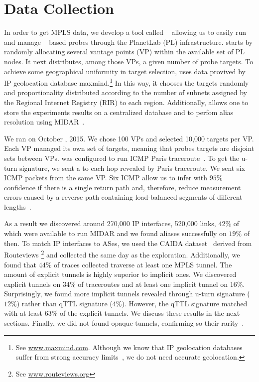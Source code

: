 \section{Data Collection}\label{dataset}
In order to get MPLS data, we develop a tool called
\magallanes~\cite{magallanes}  allowing
us to easily run and manage \scamper~\cite{Luckie10} based probes through the
PlanetLab (PL) infrastructure.  \magallanes starts by randomly allocating
several vantage points (VP) within the available set of PL nodes.  It next
distributes, among those VPs, a given number of probe targets.
To achieve some geographical uniformity in target selection, \magallanes uses
data provived by IP geolocation database maxmind.\footnote{See
\url{www.maxmind.com}.  Although we know that IP geolocation databases suffer
from strong accuracy limits~\cite{geolocation}, we do not need accurate geolocation.}  In this way, it chooses the
targets randomly and proportionality distributed according to the number of
subnets assigned by the Regional Internet Registry (RIR) to each region.
Additionally, \magallanes allows one to store the experiments results on a
centralized database and to perfom alias resolution using MIDAR~\cite{Keys13}.

We ran \magallanes on October , 2015.  We chose 100 VPs and selected
10,000 targets per VP.  Each VP managed its own set of targets, meaning that
probes targets are disjoint sets between VPs.  \scamper was configured to run
ICMP Paris traceroute~\cite{BRICE06}.  To get the u-turn signature,
we sent a \ping to each hop revealed by Paris traceroute. We sent six
ICMP \echorequest packets from the same VP.  Six ICMP \echoreply allow us to
infer with $95\%$ confidence if there is a single return path and, 
therefore, reduce measurement errors caused by a reverse path containing
load-balanced segments of different lengths~\cite{BRICE07}. 

As a result we discovered around 270,000 IP interfaces,  520,000 links, $42\%$
of which were available to run MIDAR and we found aliases successfully on $19\%$
of then. To match IP interfaces to ASes, we used the CAIDA
dataset~\cite{caida_ref} derived from Routeviews \footnote{See
\url{www.routeviews.org}} and collected the same day as the exploration.
Additionally, we found that $44\%$ of traces collected traverse at least one
MPLS tunnel.  The amount of explicit tunnels is highly superior to implicit
ones. We discovered explicit tunnels on $34\%$ of traceroutes and at least one
implicit tunnel on $16\%$. Surprisingly, we found more implicit tunnels revealed
through u-turn signature ($12\%$) rather than qTTL signature
($4\%$). However, the qTTL signature matched with at least $63\%$ of
the explicit tunnels. We discuss these results in the next sections. Finally, we
did not found opaque tunnels, confirming so their rarity~\cite{VAN2013}.
